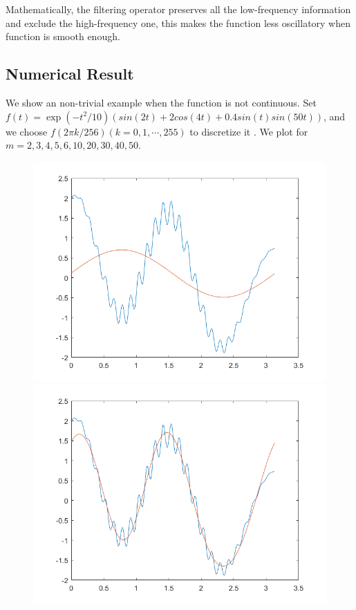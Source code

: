 \documentclass{article}
\begin{document}
Mathematically, the filtering operator preserves all the low-frequency information and exclude the high-frequency one, this makes the function less oscillatory when function is smooth enough. 
\subsection{Numerical Result}
We show an non-trivial example when the function is not continuous. Set $f(t)= \exp(-t^2/10)(sin(2t)+2cos(4t)+0.4sin(t)sin(50t))$, and we choose $f(2\pi k/256) (k = 0,1,\cdots, 255)$ to discretize it .
We plot for $m = 2,3,4,5,6,10,20,30,40,50$.
\begin{figure}
	\includegraphics[scale=.5]{../res1.png}
	\includegraphics[scale=.5]{../res3.png}

\end{figure}
\end{document}
